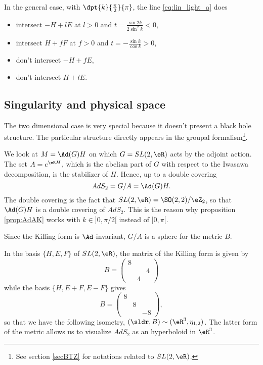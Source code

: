 In the general case, with $\dpt{k}{\frac{\pi}{2}}{\pi}$, the line \eqref{eq:lin_light_a} does

\begin{itemize}
\item intersect $-H+lE$ at $l>0$ and $t=\frac{\sin 2k}{2\sin^2k}<0$,
\item intersect $H+fF$ at $f>0$ and $t=-\frac{\sin k}{\cos k}>0$,
\item don't intersect $-H+fE$,
\item don't intersect $H+lE$.
\end{itemize}





\subsection{Singularity and physical space}

The two dimensional case is very special because it doesn't present a black hole structure. The particular structure directly appears in the groupal formalism\footnote{See section \ref{secBTZ} for notations related to $SL(2,\eR)$.}.

We look at $M=\Ad(G)H$ on which $G=SL(2,\eR)$ acts by the adjoint action. The set $A=e^{\eR H}$, which is the abelian part of $G$ with respect to the Iwasawa decomposition, is the stabilizer of $H$. Hence, up to a double covering
\begin{equation}
AdS_2=G/A=\Ad(G)H.
\end{equation}
The double covering is the fact that $SL(2,\eR)=\SO(2,2)/\eZ_2$, so that $\Ad(G)H$ is a double covering of $AdS_2$. This is the reason why proposition \ref{prop:AdAK} works with $k\in]0,\pi/2[$ instead of $]0,\pi[$.

Since the Killing form is $\Ad$-invariant, $G/A$ is a sphere for the metric $B$.

 In the basis $\{H,E,F\}$ of $SL(2,\eR)$, the matrix of the Killing form is given by
\begin{equation}
B=
\begin{pmatrix}
8&&\\
&&4\\
&4&
\end{pmatrix}
\end{equation}
while the basis  $\{H,E+F,E-F\}$ gives
\[
B=
\begin{pmatrix}
8\\
&8\\
&&-8
\end{pmatrix},
\]
so that we have the following isometry, $(\sldr,B)\sim(\eR^3,\eta_{1,2})$. The latter form of the metric allows us to visualize $AdS_2$ as an hyperboloid in $\eR^3$.

